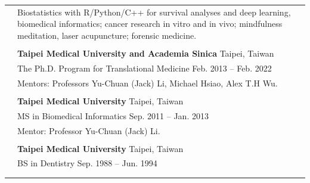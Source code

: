 \vspace{5mm}

\setlength{\tabcolsep}{8pt}

\begin{longtable}{p{1.3in}p{4.8in}}


\nohyphens{\color{OliveGreen}{Research interests}}
& Biostatistics with R/Python/C++ for survival analyses and deep learning, biomedical informatics; cancer research in vitro and in vivo; mindfulness meditation, laser acupuncture; forensic medicine. \\
& \\


\color{OliveGreen}{Education} 
& \textbf{Taipei Medical University and Academia Sinica} \hfill Taipei, Taiwan \\ 
& The Ph.D. Program for  Translational Medicine \hfill Feb. 2013 -- Feb. 2022 \\
& Mentors: Professors Yu-Chuan (Jack) Li, Michael Hsiao, Alex T.H Wu. \\
& \\

& \textbf{Taipei Medical University} \hfill Taipei, Taiwan \\
& MS in Biomedical Informatics \hfill Sep. 2011 -- Jan. 2013\\
& Mentor: Professor Yu-Chuan (Jack) Li.\\ %
& \\

& \textbf{Taipei Medical University} \hfill Taipei, Taiwan \\
& BS in Dentistry \hfill Sep. 1988 -- Jun. 1994 \\
& \\%
& \\



\end{longtable}
